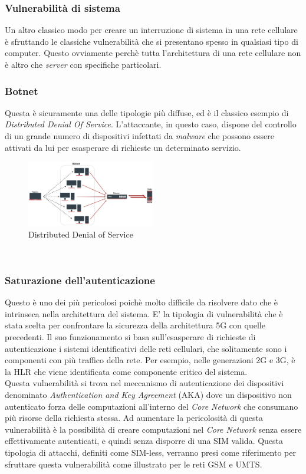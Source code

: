 \subsubsection{Vulnerabilità di sistema}
Un altro classico modo per creare un interruzione di sistema in una rete cellulare è sfruttando le classiche vulnerabilità che si presentano spesso in qualsiasi tipo di computer.
Questo ovviamente perchè tutta l'architettura di una rete cellulare non è altro che \textit{server} con specifiche particolari.

\clearpage

\subsubsection{Botnet}
Questa è sicuramente una delle tipologie più diffuse, ed è il classico esempio di \textit{Distributed Denial Of Service}. L'attaccante, in questo caso, dispone del controllo di 
un grande numero di dispositivi infettati da \textit{malware} che possono essere attivati da lui per esasperare di richieste un determinato servizio.
\begin{figure}[h]
    \centering
    \includegraphics[width=0.5\textwidth]{images/ddos.jpg}
    \caption{Distributed Denial of Service}
\end{figure}\\

\subsubsection{Saturazione dell'autenticazione}
Questo è uno dei più pericolosi poichè molto difficile da risolvere dato che è intrinseca nella architettura del sistema.
E' la tipologia di vulnerabilità che è stata scelta per confrontare la sicurezza della architettura 5G con quelle precedenti.
Il suo funzionamento si basa sull'esasperare di richieste di autenticazione i sistemi identificativi delle reti cellulari, che solitamente 
sono i componenti con più traffico della rete. Per esempio, nelle generazioni 2G e 3G, è la HLR che viene identificata come componente critico del
sistema.\\
Questa vulnerabilità si trova nel meccanismo di autenticazione dei dispositivi denominato \textit{Authentication and Key Agreement} (AKA) dove un dispositivo
non autenticato forza delle computazioni all'interno del \textit{Core Network} che consumano più risorse della richiesta stessa\cite{umts-dos}.
Ad aumentare la pericolosità di questa vulnerabilità è la possibilità di creare computazioni nel \textit{Core Network} senza essere effettivamente autenticati, e quindi 
senza disporre di una SIM valida. Questa tipologia di attacchi, definiti come SIM-less, verranno presi come riferimento per sfruttare questa vulnerabilità come illustrato per le 
reti GSM\cite{gsm-dos-simless} e UMTS\cite{umts-dos}.


